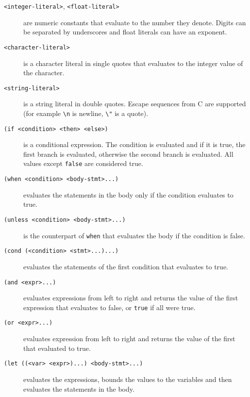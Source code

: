 \begin{description}
  \item[\texttt{<integer-literal>}, \texttt{<float-literal>}] are numeric
    constants that evaluate to the number they denote. Digits can be separated
    by underscores and float literals can have an exponent.

  \item[\texttt{<character-literal>}] is a character literal in single quotes
    that evaluates to the integer value of the character.

  \item[\texttt{<string-literal>}] is a string literal in double quotes. Escape
    sequences from C are supported (for example \texttt{\textbackslash{}n} is
    newline, \texttt{\textbackslash{}"} is a quote).

  \item[\texttt{(if <condition> <then> <else>)}] is a conditional expression.
    The condition is evaluated and if it is true, the first branch is evaluated,
    otherwise the second branch is evaluated. All values except \texttt{false}
    are considered true.

  \item[\texttt{(when <condition> <body-stmt>...)}] evaluates the statements in
    the body only if the condition evaluates to true.

  \item[\texttt{(unless <condition> <body-stmt>...)}] is the counterpart of
    \texttt{when} that evaluates the body if the condition is false.
    
  \item[\texttt{(cond (<condition> <stmt>...)...)}] evaluates the statements of
    the first condition that evaluates to true.

  \item[\texttt{(and <expr>...)}] evaluates expressions from left to right and
    returns the value of the first expression that evaluates to false, or
    \texttt{true} if all were true.

  \item[\texttt{(or <expr>...)}] evaluates expression from left to right and
    returns the value of the first that evaluated to true.

  \item[\texttt{(let ((<var> <expr>)...) <body-stmt>...)}] evaluates the
    expressions, bounds the values to the variables and then evaluates the
    statements in the body.


\end{description}
